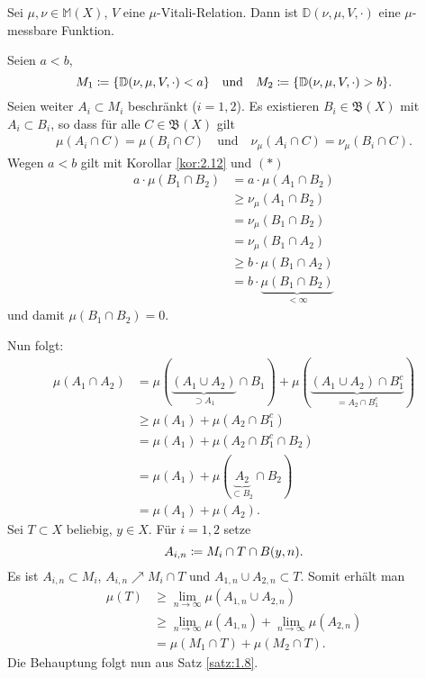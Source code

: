 \documentclass[a4paper,twoside,DIV15,BCOR12mm]{scrbook}
\newcommand{\borel}{\mathfrak B}
\begin{document}
\begin{lemma}
\label{lem2.14}
Sei \(\mu,\nu \in \mathbb{M}(X)\), \(V\) eine \(\mu\)-Vitali-Relation. Dann ist \(\mathbb{D}(\nu,\mu,V,\cdot)\) eine \(\mu\)-messbare Funktion.
\end{lemma}
\begin{beweis}
Seien \(a<b\),
\[
M_1 \da \{ \mathbb{D}(\nu,\mu,V,\cdot) < a \} \quad\text{und}\quad  M_2 \da \{ \mathbb{D}(\nu,\mu,V,\cdot) > b \}.
\]
Seien weiter \(A_i \subset M_i\) beschränkt (\(i=1,2\)).
Es existieren \(B_i \in \borel(X)\) mit \(A_i \subset B_i\), so dass für alle $ C\in\borel(X)$ gilt
\begin{align*}
 \mu(A_i\cap C) = \mu(B_i \cap C) \quad\text{und}\quad \nu_\mu(A_i\cap C) = \nu_\mu(B_i \cap C)\tag{$\ast$}.
\end{align*}
Wegen \(a<b\) gilt mit Korollar \ref{kor:2.12} und \((\ast)\)
\begin{align*}
a \cdot \mu(B_1 \cap B_2)
&= a\cdot\mu(A_1 \cap B_2) \\
&\geq \nu_\mu(A_1 \cap B_2) \\
&= \nu_\mu(B_1 \cap B_2) \\
&= \nu_\mu(B_1 \cap A_2) \\
&\geq b\cdot\mu(B_1 \cap A_2) \\
&= b\cdot\underbrace{\mu(B_1\cap B_2)}_{<\infty}
\end{align*}
und damit $\mu(B_1 \cap B_2) = 0$.

Nun folgt:
\begin{align*}
\mu(A_1 \cap A_2) &= \mu( \underbrace{(A_1 \cup A_2)}_{\supset A_1} \cap B_1 ) + \mu( \underbrace{(A_1\cup A_2)\cap B_1^c}_{=A_2\cap B_1^c} ) \\
&\geq \mu(A_1) + \mu(A_2 \cap B_1^c) \\ &= \mu(A_1) + \mu(A_2 \cap B_1^c \cap B_2) \\
&= \mu(A_1) + \mu(\underbrace{A_2}_{\subset B_2} \cap B_2) \\
&= \mu(A_1) + \mu(A_2).
\end{align*}
Sei \(T \subset X\) beliebig, \(y \in X\). Für $i=1,2$ setze
\[
A_{i,n} \da M_i \cap T \cap B(y,n) .
\]
Es ist \(A_{i,n} \subset M_i\), \(A_{i,n}\nearrow M_i \cap T\) und \(A_{1,n} \cup A_{2,n} \subset T\). Somit 
erhält man
\begin{align*}
\mu(T) &\geq \lim_{n\rightarrow\infty} \mu(A_{1,n} \cup A_{2,n})\\
&\geq \lim_{n\rightarrow\infty} \mu(A_{1,n}) + \lim_{n\rightarrow\infty} \mu(A_{2,n}) \\
&= \mu(M_1 \cap T) + \mu(M_2 \cap T).
\end{align*}
Die Behauptung folgt nun aus Satz \ref{satz:1.8}.
\end{beweis}
\end{document}
